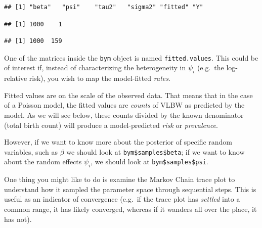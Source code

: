 \documentclass[
]{book}
\newenvironment{Shaded}{\begin{snugshade}}{\end{snugshade}}
\newcommand{\CommentTok}[1]{\textcolor[rgb]{0.56,0.35,0.01}{\textit{#1}}}
\newcommand{\FunctionTok}[1]{\textcolor[rgb]{0.13,0.29,0.53}{\textbf{#1}}}
\newcommand{\NormalTok}[1]{#1}
\newcommand{\SpecialCharTok}[1]{\textcolor[rgb]{0.81,0.36,0.00}{\textbf{#1}}}
\begin{document}
\begin{verbatim}
## [1] "beta"   "psi"    "tau2"   "sigma2" "fitted" "Y"
\end{verbatim}

\begin{Shaded}
\end{Shaded}

\begin{verbatim}
## [1] 1000    1
\end{verbatim}

\begin{Shaded}
\end{Shaded}

\begin{verbatim}
## [1] 1000  159
\end{verbatim}

One of the matrices inside the \texttt{bym} object is named \texttt{fitted.values}. This could be of interest if, instead of characterizing the heterogeneity in \(\psi_i\) (e.g.~the log-relative risk), you wish to map the model-fitted \emph{rates}.

Fitted values are on the scale of the observed data. That means that in the case of a Poisson model, the fitted values are \emph{counts} of VLBW as predicted by the model. As we will see below, these counts divided by the known denominator (total birth count) will produce a model-predicted \emph{risk} or \emph{prevalence}.

However, if we want to know more about the posterior of specific random variables, such as \(\beta\) we should look at \texttt{bym\$samples\$beta}; if we want to know about the random effects \(\psi_i\), we should look at \texttt{bym\$samples\$psi}.

One thing you might like to do is examine the Markov Chain trace plot to understand how it sampled the parameter space through sequential steps. This is useful as an indicator of convergence (e.g.~if the trace plot has \emph{settled} into a common range, it has likely converged, whereas if it wanders all over the place, it has not).
\end{document}

